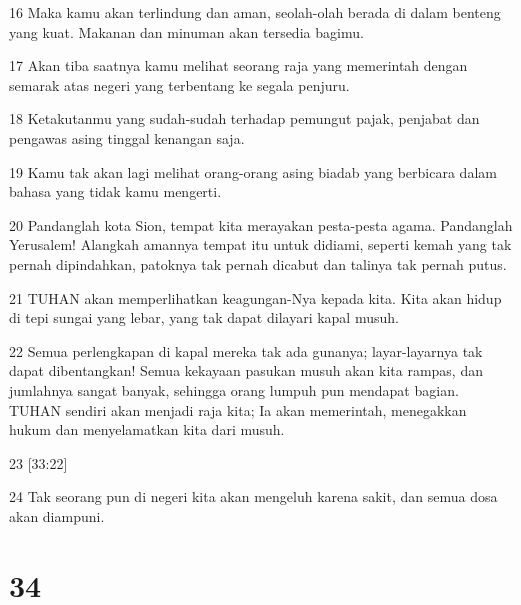 \par 16 Maka kamu akan terlindung dan aman, seolah-olah berada di dalam benteng yang kuat. Makanan dan minuman akan tersedia bagimu.
\par 17 Akan tiba saatnya kamu melihat seorang raja yang memerintah dengan semarak atas negeri yang terbentang ke segala penjuru.
\par 18 Ketakutanmu yang sudah-sudah terhadap pemungut pajak, penjabat dan pengawas asing tinggal kenangan saja.
\par 19 Kamu tak akan lagi melihat orang-orang asing biadab yang berbicara dalam bahasa yang tidak kamu mengerti.
\par 20 Pandanglah kota Sion, tempat kita merayakan pesta-pesta agama. Pandanglah Yerusalem! Alangkah amannya tempat itu untuk didiami, seperti kemah yang tak pernah dipindahkan, patoknya tak pernah dicabut dan talinya tak pernah putus.
\par 21 TUHAN akan memperlihatkan keagungan-Nya kepada kita. Kita akan hidup di tepi sungai yang lebar, yang tak dapat dilayari kapal musuh.
\par 22 Semua perlengkapan di kapal mereka tak ada gunanya; layar-layarnya tak dapat dibentangkan! Semua kekayaan pasukan musuh akan kita rampas, dan jumlahnya sangat banyak, sehingga orang lumpuh pun mendapat bagian. TUHAN sendiri akan menjadi raja kita; Ia akan memerintah, menegakkan hukum dan menyelamatkan kita dari musuh.
\par 23 [33:22]
\par 24 Tak seorang pun di negeri kita akan mengeluh karena sakit, dan semua dosa akan diampuni.

\chapter{34}

